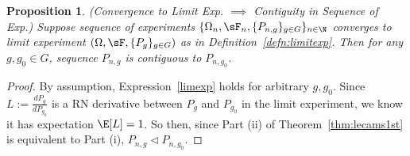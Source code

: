 \documentclass[12pt]{article}
\theoremstyle{plain}
\newtheorem{prop}[thm]{Proposition}
\theoremstyle{definition}
\theoremstyle{remark}
\newcommand{\dto}{\xrightarrow{d}}
\begin{document}
\begin{comment}
(\emph{Derive Distribution Under $g$})
Now that we have joint convergence under $g_0$, we want the distribution
of the statistic under $g$.
By Proposition~\ref{prop:impcontiguity},
$P_{n_i,g}\vartriangleleft P_{n_i,g_0}$, i.e. the subsequence of
measures $\{P_{n_i,g}\}_{i=1}^\infty$ is contiguous to
$\{P_{n_i,g_0}\}_{i=1}^\infty$.
Therefore, we can use LeCam's Third Lemma in Theorem~\ref{thm:lecams3rd}
to get the limiting distribution under $g$.
In particular, we have
\begin{align}
  T_{n_i}\;\underset{g}{\dto}\;\tilde{T}_g
  \qquad \text{where}\quad
  P_{g}[\tilde{T}_g\in B]
  = \E_{g}[\mathbf{1}\{\tilde{T}_g\in B\}]
  =\E_{g_0}\left[\frac{dP_g}{dP_{g_0}}\cdot \mathbf{1}\{T_{g_0}\in B\}\right]
  \label{tildeT}
\end{align}
This is the limiting distribution of the subsequence
$\{T_{n_i}\}_{i=1}^\infty$. But because the original sequence $T_n$
converges in distribution to $T_g$ (for any $g$) by assumption, this
limit of the subsequence must equal the limit of the sequence, i.e.
$\tilde{T}_g=T_g$. Hence Expression~\ref{tildeT} also characterizes the
distribution of the limit $T_g$ of the original sequence $T_n$.

(\emph{Construct Function $T(X,U)$})
Finally, we can always choose a function $T$ so that
\begin{align*}
  \begin{pmatrix}
    T(X,U) \\ X
  \end{pmatrix}
  \sim
  \begin{pmatrix}
    T_{g_0} \\ X
  \end{pmatrix}
\end{align*}
Check that this has the correct distribution under $g$ by importance
sampling.
\end{proof}
\end{comment}



\begin{prop}
\emph{(Convergence to Limit Exp. $\implies$ Contiguity in Sequence of
Exp.)}
\label{prop:impcontiguity}
Suppose sequence of experiments
$\{\Omega_n,\sF_n,\{P_{n,g}\}_{g\in G}\}_{n\in\N}$
converges to limit experiment $(\Omega,\sF,\{P_{g}\}_{g\in G})$
as in Definition~\ref{defn:limitexp}.
Then for any $g,g_0\in G$,
sequence $P_{n,g}$ is contiguous to $P_{n,g_0}$.
\end{prop}
\begin{proof}
By assumption, Expression~\ref{limexp} holds for arbitrary $g,g_0$.
Since $L:=\frac{dP_g}{dP_{g_0}}$ is a RN derivative between $P_{g}$ and
$P_{g_0}$ in the limit experiment, we know it has expectation $\E[L]=1$.
So then, since Part (ii) of Theorem~\ref{thm:lecams1st} is equivalent to
Part (i), $P_{n,g}\vartriangleleft P_{n,g_0}$.
\end{proof}
\end{document}

